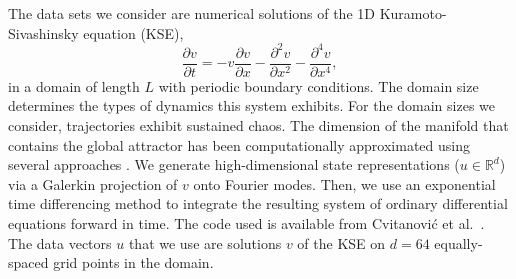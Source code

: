 \documentclass[preprint,aps,pre,letterpaper,onecolumn,superscriptaddress]{revtex4-2} %
\begin{document}
The data sets we consider are numerical solutions of the 1D Kuramoto-Sivashinsky equation (KSE),
\begin{equation}\label{eq:KSE}
	\dfrac{\partial v}{\partial t}=-v\dfrac{\partial v}{\partial x}-\dfrac{\partial^2 v}{\partial x^2}-\dfrac{\partial^4 v}{\partial x^4}, 
\end{equation}
in a domain of length $L$ with periodic boundary conditions. The domain size determines the types of dynamics this system exhibits. For the domain sizes we consider, trajectories exhibit sustained chaos. The dimension of the manifold that contains the global attractor has been computationally approximated using several approaches \cite{Yang2009,Ding2016,Linot2020}. We generate high-dimensional state representations ($u\in\mathbb{R}^d$) via a Galerkin projection  of $v$ onto Fourier modes. Then, we use an exponential time differencing method \cite{Kassam2005} to integrate the resulting system of ordinary differential equations forward in time. The code used is available from Cvitanovi\'c et al.\ \cite{ChaosBook}. The data vectors $u$ that we use are solutions $v$ of the KSE on $d=64$ equally-spaced grid points in the domain.


%
\end{document}
